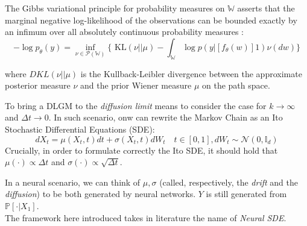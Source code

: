 \documentclass[11pt]{article}
\begin{document}
The Gibbs variational principle for probability measures on $\mathbb{W}$ asserts that the marginal negative log-likelihood of the observations can be bounded exactly by an infimum over all absolutely continuous probability measures :
\begin{equation}
-\log p_\theta(y) = \inf_{\nu \in \mathcal{P}(\mathbb{W})} \{ \text{ KL}(\nu || \mu) - \int_{\mathbb{W}} \log p(y | [f_\theta(w)]1) \nu(dw) \}  
\end{equation}

where $D{KL}(\nu || \mu)$ is the Kullback-Leibler divergence between the approximate posterior measure $\nu$ and the prior Wiener measure $\mu$ on the path space.

To bring a DLGM to the \textit{diffusion limit} means to consider the case for $k \rightarrow \infty$ and $\Delta t \rightarrow 0$. 
In such scenario, onw can rewrite the Markov Chain as an Ito Stochastic Differential Equations (SDE):
\begin{equation}
  dX_t = \mu(X_t, t)dt + \sigma(X_t, t)dW_t \quad t \in [0, 1], dW_t \sim \mathcal{N}(0, \mathbb{I}_d) \label{eq:dglm-ito-limit} 
\end{equation} 
Crucially, in order to formulate correctly the Ito SDE, it should hold that $\mu(\cdot) \propto \Delta t $ and $\sigma(\cdot) \propto \sqrt{\Delta t}$. 

In a neural scenario, we can think of $\mu, \sigma$ (called, respectively, the \textit{drift} and the \textit{diffusion}) to be both generated by neural networks. 
$Y$ is still generated from $\mathbb{P}[\cdot | X_1] $. \\ 
The framework here introduced takes in literature the name of \textit{Neural SDE}. 
\end{document}
